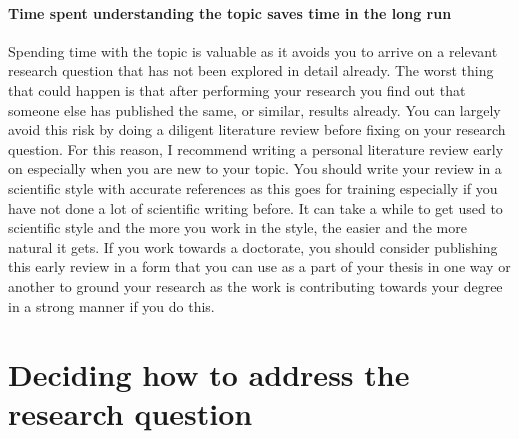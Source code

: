 \paragraph{Time spent understanding the topic saves time in the long run}

Spending time with the topic is valuable as it avoids you to arrive on a relevant research question that has not been explored in detail already.
The worst thing that could happen is that after performing your research you find out that someone else has published the same, or similar, results already.
You can largely avoid this risk by doing a diligent literature review before fixing on your research question.
For this reason, I recommend writing a personal literature review early on especially when you are new to your topic.
You should write your review in a scientific style with accurate references as this goes for training especially if you have not done a lot of scientific writing before.
It can take a while to get used to scientific style and the more you work in the style, the easier and the more natural it gets.
If you work towards a doctorate, you should consider publishing this early review in a form that you can use as a part of your thesis in one way or another to ground your research as the work is contributing towards your degree in a strong manner if you do this.





\section{Deciding how to address the research question}


